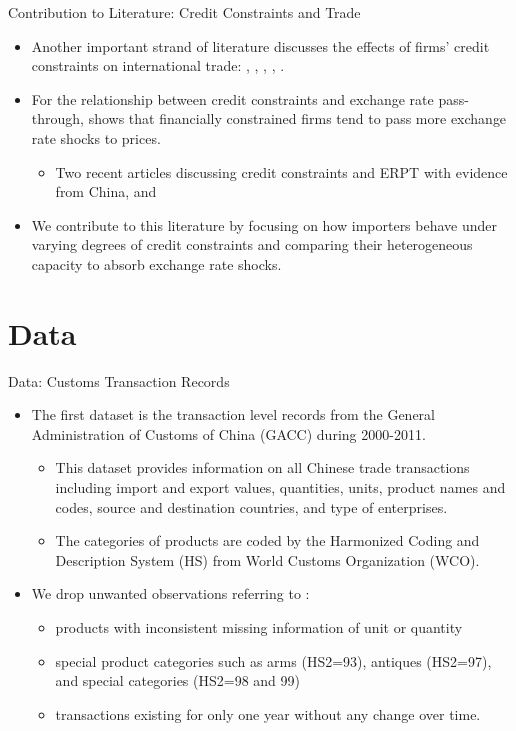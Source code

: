 \documentclass[10pt]{beamer}
\begin{document}
\begin{frame}{Contribution to Literature: Credit Constraints and Trade}
	\begin{itemize}
		\item Another important strand of literature discusses the effects of firms’ credit constraints on international trade: \cite{kroszner2007} \cite{manova2013}, \cite{chaney2016}, \cite{feenstra2015}, \cite{manova-wei-zhang2015}, \cite{fan-lai-li2015}.
		\item For the relationship between credit constraints and exchange rate pass-through, \cite{strasser2013} shows that financially constrained firms tend to pass more exchange rate shocks to prices.
		\begin{itemize}
			\item Two recent articles discussing credit constraints and ERPT with evidence from China, \cite{dai2021} and \cite{xu-guo2021}
		\end{itemize}
		\item We contribute to this literature by focusing on how importers behave under varying degrees of credit constraints and comparing their heterogeneous capacity to absorb exchange rate shocks. 
	\end{itemize}	
\end{frame}

\section{Data}

\begin{frame}{Data: Customs Transaction Records}
	\begin{itemize}
		\item The first dataset is the transaction level records from the General Administration of Customs of China (GACC) during 2000-2011.
		\begin{itemize}
			\item This dataset provides information on
			all Chinese trade transactions including import and export values, quantities, units, product names and codes, source and destination countries, and type of enterprises.
			\item The categories of products are coded by the Harmonized Coding and Description System (HS) from World Customs Organization (WCO).
		\end{itemize}
		\item We drop unwanted observations referring to \cite{lmx2015}:
		\begin{itemize}
			\item products with inconsistent missing information of unit or quantity
			\item special product categories such as arms (HS2=93), antiques (HS2=97), and special categories (HS2=98 and 99)
			\item transactions existing for only one year without any change over time.
		\end{itemize}
	\end{itemize}
\end{frame}
\end{document}
